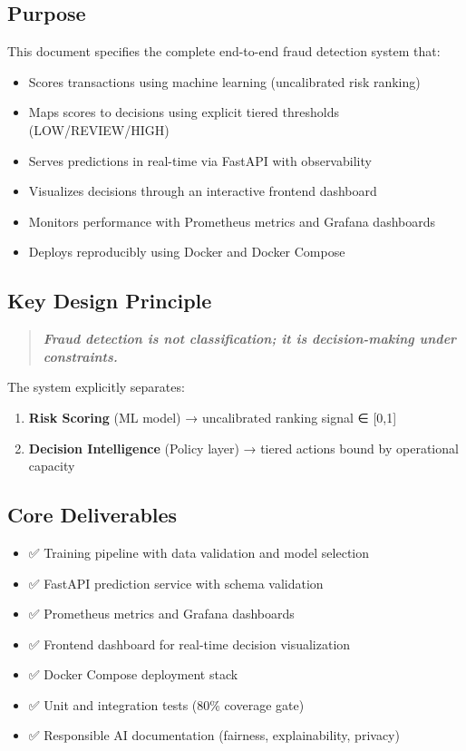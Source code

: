 \documentclass[12pt,a4paper]{article}
\begin{document}
\subsection{Purpose}
This document specifies the complete end-to-end fraud detection system that:
\begin{itemize}
    \item Scores transactions using machine learning (uncalibrated risk ranking)
    \item Maps scores to decisions using explicit tiered thresholds (LOW/REVIEW/HIGH)
    \item Serves predictions in real-time via FastAPI with observability
    \item Visualizes decisions through an interactive frontend dashboard
    \item Monitors performance with Prometheus metrics and Grafana dashboards
    \item Deploys reproducibly using Docker and Docker Compose
\end{itemize}

\subsection{Key Design Principle}
\begin{quote}
\textbf{\textit{Fraud detection is not classification; it is decision-making under constraints.}}
\end{quote}

The system explicitly separates:
\begin{enumerate}
    \item \textbf{Risk Scoring} (ML model) → uncalibrated ranking signal ∈ [0,1]
    \item \textbf{Decision Intelligence} (Policy layer) → tiered actions bound by operational capacity
\end{enumerate}

\subsection{Core Deliverables}
\begin{itemize}
    \item ✅ Training pipeline with data validation and model selection
    \item ✅ FastAPI prediction service with schema validation
    \item ✅ Prometheus metrics and Grafana dashboards
    \item ✅ Frontend dashboard for real-time decision visualization
    \item ✅ Docker Compose deployment stack
    \item ✅ Unit and integration tests (80\% coverage gate)
    \item ✅ Responsible AI documentation (fairness, explainability, privacy)
\end{itemize}
\end{document}
